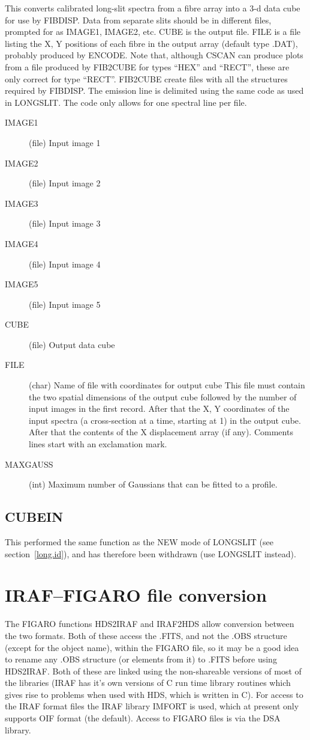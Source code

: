 This converts calibrated long-slit spectra from a fibre array into a
3-d data cube for use by FIBDISP.
Data from separate slits should be in different files, prompted for as
IMAGE1, IMAGE2, etc.
CUBE is the output file.
FILE is a file listing the X, Y positions of each fibre in the output
array (default type .DAT), probably produced by ENCODE.
Note that, although CSCAN can produce plots from a file produced by
FIB2CUBE for types ``HEX'' and ``RECT'', these are only correct for type
``RECT''.
FIB2CUBE create files with all the structures required by FIBDISP.
The emission line is delimited using the same code as used in LONGSLIT.
The code only allows for one spectral line per file.
\begin{description}
\item[IMAGE1] (file) Input image 1
\item[IMAGE2] (file) Input image 2
\item[IMAGE3] (file) Input image 3
\item[IMAGE4] (file) Input image 4
\item[IMAGE5] (file) Input image 5
\item[CUBE] (file) Output data cube
\item[FILE] (char) Name of file with coordinates for output cube This
file must contain the two spatial dimensions of the output cube followed
by the number of input images in the
first record. After that the X, Y coordinates of the input spectra (a
cross-section at a time, starting at 1) in the output cube.
After that the contents of the X displacement array (if any).
Comments lines start with an exclamation mark.
\item[MAXGAUSS] (int) Maximum number of Gaussians that can be fitted
to a profile.
\end{description}

\subsection{CUBEIN}

This performed the same function as the NEW mode of LONGSLIT (see
section~\ref{long.id}), and has therefore been withdrawn (use LONGSLIT
instead).

\section{IRAF--FIGARO file conversion}

The FIGARO functions HDS2IRAF and IRAF2HDS allow conversion between
the two formats. Both of these access the .FITS, and not the .OBS
structure (except for the object name), within the FIGARO file, so it
may be a good idea to rename any .OBS structure (or elements from it) to
.FITS before using HDS2IRAF. Both of these are linked using the
non-shareable versions of most of the libraries (IRAF has it's own
versions of C run time library routines which gives rise to problems
when used with HDS, which is written in C). For access to the IRAF
format files the IRAF library IMFORT is used, which at present only
supports OIF format (the default).
Access to FIGARO files is via the DSA library.

